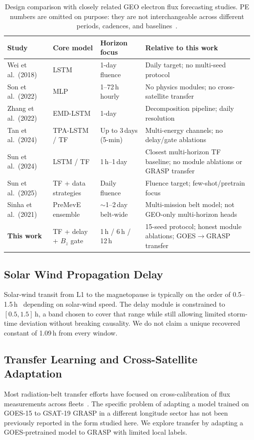 \documentclass{ieeeaccess}
\begin{document}
\begin{table}[!htbp]
\centering
\caption{Design comparison with closely related GEO electron flux forecasting studies.
PE numbers are omitted on purpose: they are not interchangeable across different
periods, cadences, and baselines~\cite{b21,b22}.}
\label{tab:compare}
\begin{tabular}{@{}lp{2.0cm}p{2.3cm}p{4.0cm}@{}}
\toprule
\textbf{Study} & \textbf{Core model} & \textbf{Horizon focus} & \textbf{Relative to this work} \\
\midrule
Wei et al.\ (2018) & LSTM & 1-day fluence & Daily target; no multi-seed protocol \\
Son et al.\ (2022) & MLP & 1--72\,h hourly & No physics modules; no cross-satellite transfer \\
Zhang et al.\ (2022) & EMD-LSTM & 1-day & Decomposition pipeline; daily resolution \\
Tan et al.\ (2024) & TPA-LSTM / TF & Up to 3\,days (5-min) & Multi-energy channels; no delay/gate ablations \\
Sun et al.\ (2024) & LSTM / TF & 1\,h--1\,day & Closest multi-horizon TF baseline; no module ablations or GRASP transfer \\
Sun et al.\ (2025) & TF + data strategies & Daily fluence & Fluence target; few-shot/pretrain focus \\
Sinha et al.\ (2021) & PreMevE ensemble & $\sim$1--2\,day belt-wide & Multi-mission belt model; not GEO-only multi-horizon heads \\
\textbf{This work} & TF + delay + \(B_z\) gate & 1\,h / 6\,h / 12\,h & 15-seed protocol; honest module ablations; GOES$\rightarrow$GRASP transfer \\
\bottomrule
\end{tabular}
\end{table}

\subsection{Solar Wind Propagation Delay}
Solar-wind transit from L1 to the magnetopause is typically on the order of 0.5--1.5\,h~\cite{b4} depending on solar-wind speed. The delay module is constrained to \([0.5, 1.5]\,\mathrm{h}\), a band chosen to cover that range while still allowing limited storm-time deviation without breaking causality. We do not claim a unique recovered constant of 1.09\,h from every window.

\subsection{Transfer Learning and Cross-Satellite Adaptation}
Most radiation-belt transfer efforts have focused on cross-calibration of flux
measurements across fleets~\cite{b25}. The specific problem of adapting a model
trained on GOES-15 to GSAT-19 GRASP in a different longitude sector has not been
previously reported in the form studied here. We explore transfer by adapting
a GOES-pretrained model to GRASP with limited local labels.
\end{document}
